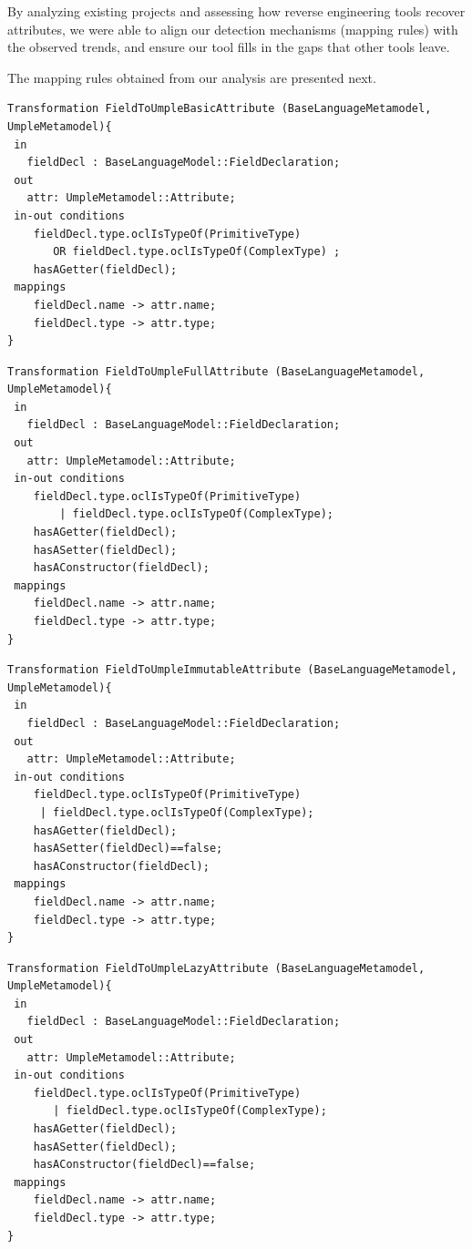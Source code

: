 By analyzing existing projects and assessing how reverse engineering tools recover attributes, we were able to align our detection mechanisms (mapping rules) with the observed trends, and ensure our tool fills in the gaps that other tools leave.

The mapping rules obtained from our analysis are presented next.

\begin{lstlisting}[style=mine,caption=Case 1 - Variable has a getter ,label=lst:attrCase1]
Transformation FieldToUmpleBasicAttribute (BaseLanguageMetamodel, UmpleMetamodel){ 
 in
   fieldDecl : BaseLanguageModel::FieldDeclaration;
 out
   attr: UmpleMetamodel::Attribute;
 in-out conditions
 	fieldDecl.type.oclIsTypeOf(PrimitiveType) 
 	   OR fieldDecl.type.oclIsTypeOf(ComplexType) ;
 	hasAGetter(fieldDecl);
 mappings
    fieldDecl.name -> attr.name;
    fieldDecl.type -> attr.type;
}
\end{lstlisting}

\begin{lstlisting}[style=mine,caption=Is a fully editable attribute,label=lst:attrCase2]
Transformation FieldToUmpleFullAttribute (BaseLanguageMetamodel, UmpleMetamodel){ 
 in
   fieldDecl : BaseLanguageModel::FieldDeclaration;
 out
   attr: UmpleMetamodel::Attribute;
 in-out conditions
 	fieldDecl.type.oclIsTypeOf(PrimitiveType)
 	    | fieldDecl.type.oclIsTypeOf(ComplexType);
 	hasAGetter(fieldDecl);
 	hasASetter(fieldDecl);
 	hasAConstructor(fieldDecl);
 mappings
    fieldDecl.name -> attr.name;
    fieldDecl.type -> attr.type;
}
\end{lstlisting}

\begin{lstlisting}[style=mine,caption=Is an immutable attribute,label=lst:attrCase3]
Transformation FieldToUmpleImmutableAttribute (BaseLanguageMetamodel, UmpleMetamodel){ 
 in
   fieldDecl : BaseLanguageModel::FieldDeclaration;
 out
   attr: UmpleMetamodel::Attribute;
 in-out conditions
 	fieldDecl.type.oclIsTypeOf(PrimitiveType)
 	 | fieldDecl.type.oclIsTypeOf(ComplexType);
 	hasAGetter(fieldDecl);
 	hasASetter(fieldDecl)==false;
 	hasAConstructor(fieldDecl);
 mappings
    fieldDecl.name -> attr.name;
    fieldDecl.type -> attr.type;
}
\end{lstlisting}

\begin{lstlisting}[style=mine,caption=Is a lazy attribute,label=lst:attrCase4]
Transformation FieldToUmpleLazyAttribute (BaseLanguageMetamodel, UmpleMetamodel){ 
 in
   fieldDecl : BaseLanguageModel::FieldDeclaration;
 out
   attr: UmpleMetamodel::Attribute;
 in-out conditions
 	fieldDecl.type.oclIsTypeOf(PrimitiveType)
 	   | fieldDecl.type.oclIsTypeOf(ComplexType);
 	hasAGetter(fieldDecl);
 	hasASetter(fieldDecl);
 	hasAConstructor(fieldDecl)==false;
 mappings
    fieldDecl.name -> attr.name;
    fieldDecl.type -> attr.type;
}
\end{lstlisting}

